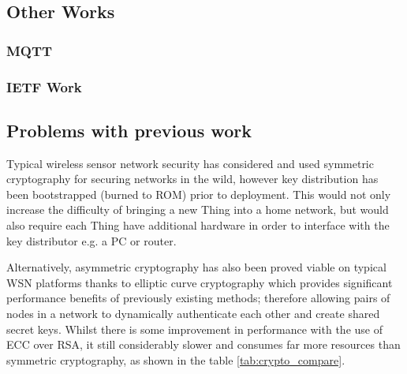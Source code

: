 \documentclass{mprop}
\begin{document}


\subsection{Other Works} %
\label{sub:other_works}
\subsubsection{MQTT} %
\label{ssub:mqtt}

\subsubsection{IETF Work} %
\label{ssub:ietf_work}
\cite{IETF_COAP_HTTP, IETF_CORE}

\subsection{Problems with previous work} %
\label{sub:problems_with_previous_work}

Typical wireless sensor network security has considered and used symmetric cryptography\cite{TinySec,MiniSec, ContikiSec} for securing networks in the wild, however key distribution has been bootstrapped (burned to ROM) prior to deployment. This would not only increase the difficulty of bringing a new Thing into a home network, but would also require each Thing have additional hardware in order to interface with the key distributor e.g. a PC or router. 

Alternatively, asymmetric cryptography has also been proved viable on typical WSN platforms thanks to elliptic curve cryptography which provides significant performance benefits of previously existing methods\cite{TinyECC}; therefore allowing pairs of nodes in a network to dynamically authenticate each other and create shared secret keys. Whilst there is some improvement in performance with the use of ECC over RSA, it still considerably slower and consumes far more resources than symmetric cryptography, as shown in the table \ref{tab:crypto_compare}.
\end{document}
